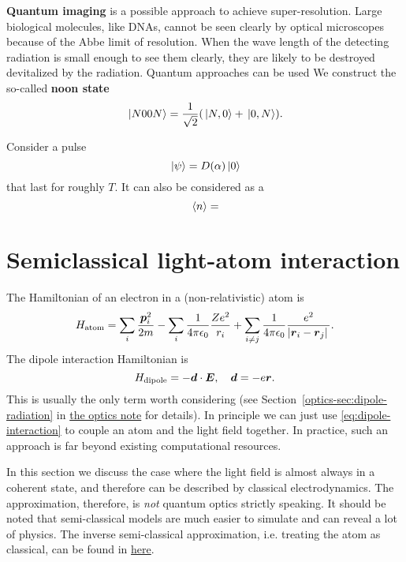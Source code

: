 \documentclass[hyperref, a4paper]{article}
\newcommand*{\concept}[1]{{\textbf{#1}}}
\newcommand{\opticsdoc}{\href{../optics/optics}{the optics note}}
\begin{document}
\concept{Quantum imaging} is a possible approach to achieve super-resolution. 
Large biological molecules, like DNAs, cannot be seen clearly by optical microscopes because of the Abbe limit of resolution.
When the wave length of the detecting radiation is small enough to see them clearly, 
they are likely to be destroyed devitalized by the radiation.
Quantum approaches can be used 
We construct the so-called \concept{noon state}
\begin{equation}
    \ket*{N 00 N} = \frac{1}{\sqrt{2}} (\ket*{N, 0} + \ket*{0, N}).
\end{equation}

Consider a pulse 
\begin{equation}
    \ket*{\psi} = D(\alpha) \ket*{0}
\end{equation}
that last for roughly $T$. It can also be considered as a 
\begin{equation}
    \expval*{n} = 
\end{equation}

\section{Semiclassical light-atom interaction}

The Hamiltonian of an electron in a (non-relativistic) atom is 
\begin{equation}
    H_\text{atom} = \sum_{i} \frac{\vb*{p}_i^2}{2m} - \sum_{i} \frac{1}{4 \pi \epsilon_0} \frac{Z e^2}{r_i} + \sum_{i \neq j} \frac{1}{4 \pi \epsilon_0} \frac{e^2}{\abs*{\vb*{r}_i - \vb*{r}_j}}.
\end{equation}
The dipole interaction Hamiltonian is 
\begin{equation}
    H_\text{dipole} = - \vb*{d} \cdot \vb*{E}, \quad \vb*{d} = - e \vb*{r}.
    \label{eq:dipole-interaction}
\end{equation}
This is usually the only term worth considering (see Section~\ref{optics-sec:dipole-radiation} in \opticsdoc{} for details).
In principle we can just use \eqref{eq:dipole-interaction} to couple an atom and the light field together.
In practice, such an approach is far beyond existing computational resources.

In this section we discuss the case where the light field is almost always in a coherent state, 
and therefore can be described by classical electrodynamics.
The approximation, therefore, is \emph{not} quantum optics strictly speaking.
It should be noted that semi-classical models are much easier to simulate and can reveal a lot of physics.
The inverse semi-classical approximation, i.e. treating the atom as classical, can be found in \href{../quantum-optics-homework/1}{here}.
\end{document}
